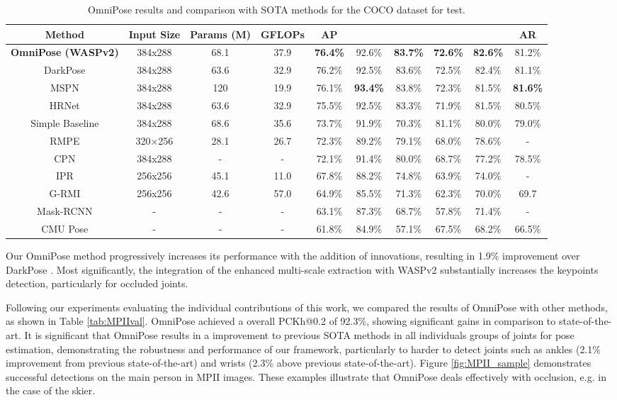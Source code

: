 \documentclass[10pt,twocolumn,letterpaper]{article}
\begin{document}
\begin{table*}[!ht]
\begin{center}
\begin{tabular}{|c|c|c|c|c|c|c|c|c|c|}
\hline
Method&Input Size&Params (M)&GFLOPs&AP&&&&&AR\\
\hline\hline
\textbf{OmniPose (WASPv2)}&384x288&
68.1&37.9&
\textbf{76.4\%}&92.6\%&
\textbf{83.7\%}&\textbf{72.6\%}&
\textbf{82.6\%}&81.2\%\\
DarkPose \cite{DarkPose}&384x288&
63.6&32.9&
76.2\%&92.5\%&
83.6\%&72.5\%&
82.4\%&81.1\%\\
MSPN \cite{MSPN}&384x288&
120&19.9&
76.1\%&\textbf{93.4\%}&
83.8\%&72.3\%&
81.5\%&\textbf{81.6\%}\\
HRNet \cite{HRNet}&384x288&
63.6&32.9&
75.5\%&92.5\%&
83.3\%&71.9\%&
81.5\%&80.5\%\\
Simple Baseline \cite{SimpleBaseline}&384x288&
68.6&35.6&
73.7\%&91.9\%&
70.3\%&81.1\%&
80.0\%&79.0\%\\
RMPE \cite{RMPE}&320×256&
28.1&26.7&
72.3\%&89.2\%&
79.1\%&68.0\%&
78.6\%&-\\
CPN \cite{CPN}&384x288&
-&-&
72.1\%&91.4\%&
80.0\%&68.7\%&
77.2\%&78.5\%\\
IPR \cite{IPR}&256x256&
45.1&11.0&
67.8\%&88.2\%&
74.8\%&63.9\%&
74.0\%&-\\
G-RMI \cite{G-RMI}&256x256&
42.6&57.0&
64.9\%&85.5\%&
71.3\%&62.3\%&
70.0\%&69.7\\
Mask-RCNN \cite{MaskRCNN}&-&
-&-&
63.1\%&87.3\%&
68.7\%&57.8\%&
71.4\%&-\\
CMU Pose \cite{OpenPose}&-&
-&-&
61.8\%&84.9\%&
57.1\%&67.5\%&
68.2\%&66.5\%\\
\hline
\end{tabular}
\end{center}
\caption{OmniPose results and comparison with SOTA methods for the COCO dataset for test.}
\label{tab:COCOtest}
\end{table*}

Our OmniPose method progressively increases its performance with the addition of innovations, resulting in 1.9\% improvement over DarkPose \cite{DarkPose}. Most significantly, the integration of the enhanced multi-scale extraction with  WASPv2 substantially increases the keypoints detection, particularly for occluded joints.

Following our experiments evaluating the individual contributions of this work, we compared the results of OmniPose with other methods, as shown in Table \ref{tab:MPIIval}.
OmniPose achieved a overall PCKh@0.2 of 92.3\%, showing significant gains in comparison to state-of-the-art. It is significant that OmniPose results in a improvement to previous SOTA methods in all individuals groups of joints for pose estimation, demonstrating the robustness and performance of our framework, particularly to harder to detect joints such as ankles (2.1\% improvement from previous state-of-the-art) and wrists (2.3\% above previous state-of-the-art).
Figure \ref{fig:MPII_sample} demonstrates successful detections on the main person in MPII images. These examples illustrate that OmniPose deals effectively with occlusion, e.g. in the case of the skier.
\end{document}
